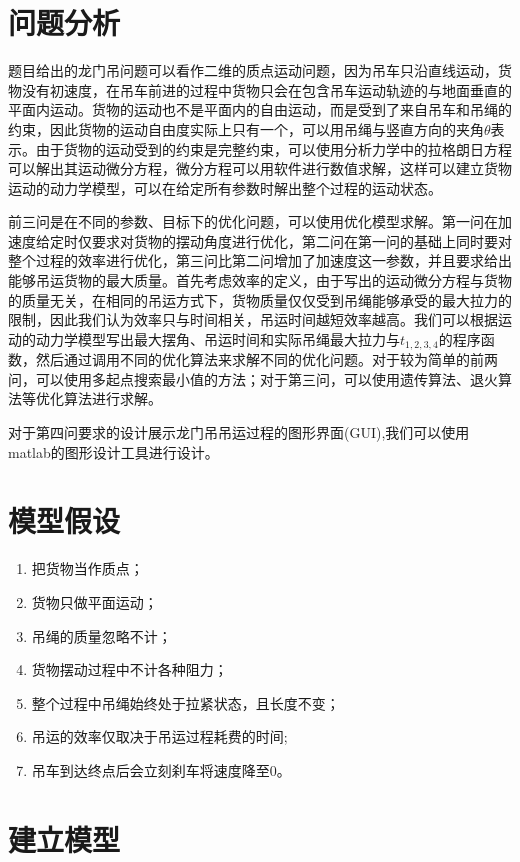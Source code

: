 \documentclass[withoutpreface,bwprint]{cumcmthesis} %
\begin{document}
\section{问题分析}
题目给出的龙门吊问题可以看作二维的质点运动问题，因为吊车只沿直线运动，货物没有初速度，在吊车前进的过程中货物只会在包含吊车运动轨迹的与地面垂直的平面内运动。货物的运动也不是平面内的自由运动，而是受到了来自吊车和吊绳的约束，因此货物的运动自由度实际上只有一个，可以用吊绳与竖直方向的夹角$\theta$表示。由于货物的运动受到的约束是完整约束，可以使用分析力学中的拉格朗日方程可以解出其运动微分方程，微分方程可以用软件进行数值求解，这样可以建立货物运动的动力学模型，可以在给定所有参数时解出整个过程的运动状态。

前三问是在不同的参数、目标下的优化问题，可以使用优化模型求解。第一问在加速度给定时仅要求对货物的摆动角度进行优化，第二问在第一问的基础上同时要对整个过程的效率进行优化，第三问比第二问增加了加速度这一参数，并且要求给出能够吊运货物的最大质量。首先考虑效率的定义，由于写出的运动微分方程与货物的质量无关，在相同的吊运方式下，货物质量仅仅受到吊绳能够承受的最大拉力的限制，因此我们认为效率只与时间相关，吊运时间越短效率越高。我们可以根据运动的动力学模型写出最大摆角、吊运时间和实际吊绳最大拉力与$t_{1,2,3,4}$的程序函数，然后通过调用不同的优化算法来求解不同的优化问题。对于较为简单的前两问，可以使用多起点搜索最小值的方法；对于第三问，可以使用遗传算法、退火算法等优化算法进行求解。

对于第四问要求的设计展示龙门吊吊运过程的图形界面(GUI),我们可以使用matlab的图形设计工具进行设计。

\section{模型假设}
\begin{enumerate}
    \item 把货物当作质点；
    \item 货物只做平面运动；
    \item 吊绳的质量忽略不计；
    \item 货物摆动过程中不计各种阻力；
    \item 整个过程中吊绳始终处于拉紧状态，且长度不变；
    \item 吊运的效率仅取决于吊运过程耗费的时间;
    \item 吊车到达终点后会立刻刹车将速度降至0。
\end{enumerate}

\section{建立模型}
\end{document}
